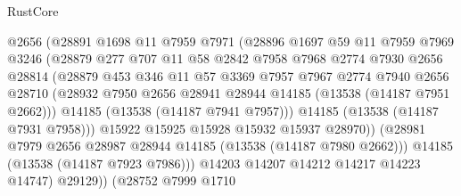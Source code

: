 \begin{lexlean}{RustCore}
\begin{coremodule}
                          @2656
                          (@28891
                            @1698
                            @11
                            @7959
                            @7971
                            (@28896
                              @1697
                              @59
                              @11
                              @7959
                              @7969
                              @3246
                              (@28879
                                @277
                                @707
                                @11
                                @58
                                @2842
                                @7958
                                @7968
                                @2774
                                @7930
                                @2656
                                @28814
                                (@28879
                                  @453
                                  @346
                                  @11
                                  @57
                                  @3369
                                  @7957
                                  @7967
                                  @2774
                                  @7940
                                  @2656
                                  @28710
                                  (@28932
                                    @7950
                                    @2656
                                    @28941
                                    @28944
                                    @14185
                                    (@13538 (@14187 @7951 @2662)))
                                  @14185
                                  (@13538 (@14187 @7941 @7957)))
                                @14185
                                (@13538 (@14187 @7931 @7958)))
                              @15922
                              @15925
                              @15928
                              @15932
                              @15937
                              @28970))
                          (@28981 @7979 @2656 @28987 @28944 @14185 (@13538 (@14187 @7980 @2662)))
                          @14185
                          (@13538 (@14187 @7923 @7986)))
                        @14203
                        @14207
                        @14212
                        @14217
                        @14223
                        @14747)
                      @29129))
                  (@28752
                    @7999
                    @1710

\end{coremodule}
\end{lexlean}
